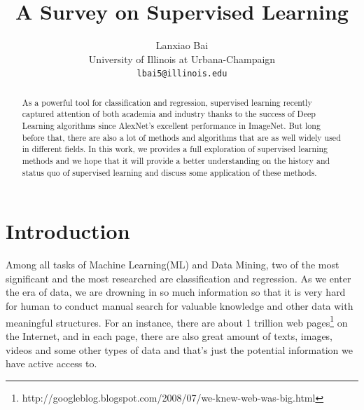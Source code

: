 \documentclass[10pt,twocolumn,letterpaper]{article}
\begin{document}
\title{A Survey on Supervised Learning}

\author{Lanxiao Bai\\
University of Illinois at Urbana-Champaign\\
{\tt\small lbai5@illinois.edu}
}

\maketitle

\begin{abstract}
   As a powerful tool for classification and regression, supervised learning recently captured attention of both academia and industry thanks to the success of Deep Learning algorithms since AlexNet's\cite{Krizhevsky:2012:ICD:2999134.2999257} excellent performance in ImageNet. But long before that, there are also a lot of methods and algorithms that are as well widely used in different fields. In this work, we provides a full exploration of supervised learning methods and we hope that it will provide a better understanding on the history and status quo of supervised learning and discuss some application of these methods.
\end{abstract}

\section{Introduction}

Among all tasks of Machine Learning(ML) and Data Mining, two of the most significant and the most researched are classification and regression. As we enter the era of data, we are drowning in so much information so that it is very hard for human to conduct manual search for valuable knowledge and other data with meaningful structures. For an instance, there are about 1 trillion web pages\footnote{http://googleblog.blogspot.com/2008/07/we-knew-web-was-big.html} on the Internet, and in each page, there are also great amount of texts, images, videos and some other types of data and that's just the potential information we have active access to.
\end{document}
